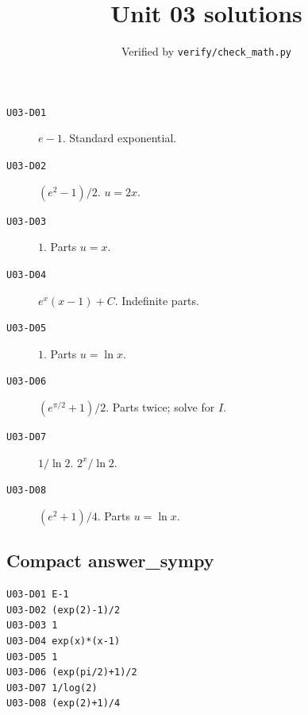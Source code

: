 
\title{Unit 03 solutions}
\author{Verified by \texttt{verify/check\_math.py}}
\date{}

\maketitle

\begin{description}
\item[\texttt{U03-D01}] \(e-1\). Standard exponential.
\item[\texttt{U03-D02}] \((e^2-1)/2\). $u=2x$.
\item[\texttt{U03-D03}] \(1\). Parts $u=x$.
\item[\texttt{U03-D04}] \(e^x(x-1)+C\). Indefinite parts.
\item[\texttt{U03-D05}] \(1\). Parts $u=\ln x$.
\item[\texttt{U03-D06}] \((e^{\pi/2}+1)/2\). Parts twice; solve for $I$.
\item[\texttt{U03-D07}] \(1/\ln 2\). $2^x/\ln 2$.
\item[\texttt{U03-D08}] \((e^2+1)/4\). Parts $u=\ln x$.
\end{description}

\subsection*{Compact answer\_sympy}
\begin{verbatim}
U03-D01 E-1
U03-D02 (exp(2)-1)/2
U03-D03 1
U03-D04 exp(x)*(x-1)
U03-D05 1
U03-D06 (exp(pi/2)+1)/2
U03-D07 1/log(2)
U03-D08 (exp(2)+1)/4
\end{verbatim}

